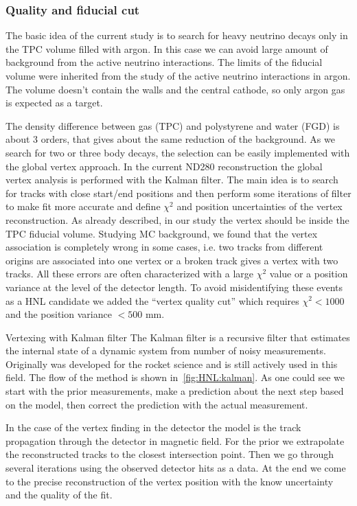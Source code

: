 \documentclass[../main.tex]{subfiles}
\begin{document}
\subsubsection{Quality and fiducial cut}
\label{sec:HNL:qf}
The basic idea of the current study is to search for heavy neutrino decays only in the TPC volume filled with argon. In this case we can avoid large amount of background from the active neutrino interactions. The limits of the fiducial volume were inherited from the study of the active neutrino interactions in argon. The volume doesn't contain the walls and the central cathode, so only argon gas is expected as a target.

The density difference between gas (TPC) and polystyrene and water (FGD) is about 3 orders, that gives about the same reduction of the background. As we search for two or three body decays, the selection can be easily implemented with the global vertex approach. In the current ND280 reconstruction the global vertex analysis is performed with the Kalman filter. The main idea is to search for tracks with close start/end positions and then perform some iterations of filter to make fit more accurate and define $\chi^2$ and position uncertainties of the vertex reconstruction. As already described, in our study the vertex should be inside the TPC fiducial volume. Studying MC background, we found that the vertex association is completely wrong in some cases, i.e. two tracks from different origins are associated into one vertex or a broken track gives a vertex with two tracks. All these errors are often characterized with a large $\chi^2$ value or a position variance at the level of the detector length. To avoid misidentifying these events as a HNL candidate we added the ``vertex quality cut'' which requires $\chi^2<1000$ and the position variance $<500$ mm.

\begin{bclogo}[couleur=blue!2, arrondi=0.1, logo=\bcinfo, nobreak=true]{Vertexing with Kalman filter}
    The Kalman filter is a recursive filter that estimates the internal state of a dynamic system from number of noisy measurements. Originally was developed for the rocket science and is still actively used in this field. The flow of the method is shown in~\autoref{fig:HNL:kalman}. As one could see we start with the prior measurements, make a prediction about the next step based on the model, then correct the prediction with the actual measurement.

    In the case of the vertex finding in the detector the model is the track propagation through the detector in magnetic field. For the prior we extrapolate the reconstructed tracks to the closest intersection point. Then we go through several iterations using the observed detector hits as a data. At the end we come to the precise reconstruction of the vertex position with the know uncertainty and the quality of the fit.
\end{bclogo}
\end{document}
